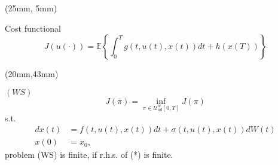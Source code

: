 \begin{frame}[plain]
    \begin{textblock*}{80mm}(25mm, 5mm)
        \begin{yellowbox}{Cost functional}
            \begin{equation*}
                J(u(\cdot))= 
                    \mathbb{E}
                        \left\{
                            \int_{0}^{T}
                                g(t,u(t),x(t))dt
                            + h(x(T))
                        \right\}
            \end{equation*}
        \end{yellowbox}
    \end{textblock*}
%
    \begin{textblock*}{90mm}(20mm,43mm)
        \begin{graybox}{$(WS)$}
            \begin{equation*}
                J(\bar{\pi})
                    =
                    \inf_{
                        \pi \in 
                            \mathcal{U}^w_{ad} [0,T]
                    }
                    J(\pi)
                    \tag{*}
            \end{equation*}
            s.t.
            \begin{align*}
                dx(t)&=
                    f(t,u(t),x(t))dt+\sigma(t,u(t),x(t))dW(t)\\
                    x(0)
                    &= x_0,
            \end{align*}
            \tcblower
            problem (WS) is finite, if r.h.s. of (*) is finite. 
        \end{graybox}
    \end{textblock*}
\end{frame}
